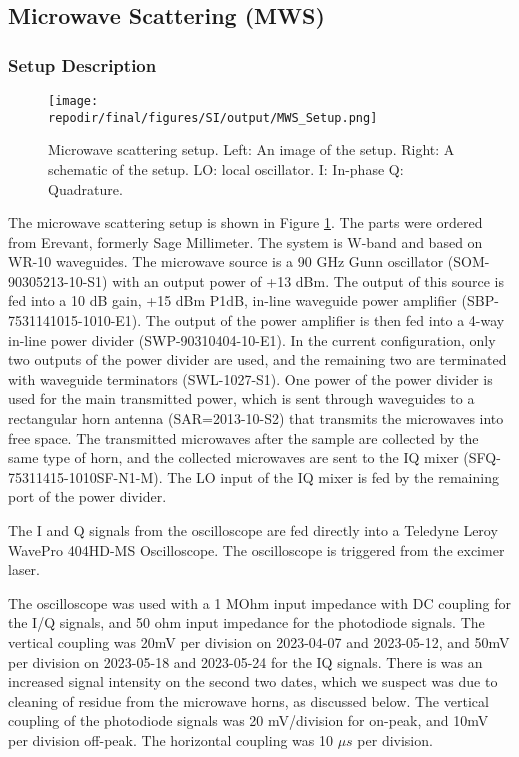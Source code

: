 \clearpage
\subsection{Microwave Scattering (MWS) }


\subsubsection{Setup Description}
\begin{figure}[]
\centering
\texttt{[image: \\repodir/final/figures/SI/output/MWS\_Setup.png]}
\caption{Microwave scattering setup. Left: An image of the setup. Right: A schematic of the setup. LO: local oscillator. I: In-phase Q: Quadrature.  }
\label{fig:SI_MWS_Setup}
\end{figure}

The microwave scattering setup is shown in Figure \ref{fig:SI_MWS_Setup}. The parts were ordered from Erevant, formerly Sage Millimeter. The system is W-band and based on WR-10 waveguides. The microwave source is a 90 GHz Gunn oscillator (SOM-90305213-10-S1) with an output power of +13 dBm. The output of this source is fed into a 10 dB gain, +15 dBm P1dB, in-line waveguide power amplifier (SBP-7531141015-1010-E1). The output of the power amplifier is then fed into a 4-way in-line power divider (SWP-90310404-10-E1). In the current configuration, only two outputs of the power divider are used, and the remaining two are terminated with waveguide terminators (SWL-1027-S1). One power of the power divider is used for the main transmitted power, which is sent through waveguides to a rectangular horn antenna (SAR=2013-10-S2) that transmits the microwaves into free space. The transmitted microwaves after the sample are collected by the same type of horn, and the collected microwaves are sent to the IQ mixer (SFQ-75311415-1010SF-N1-M). The LO input of the IQ mixer is fed by the remaining port of the power divider. 


The I and Q signals from the oscilloscope are fed directly into a Teledyne Leroy WavePro 404HD-MS Oscilloscope.  The oscilloscope is triggered from the excimer laser. 

The oscilloscope was used with a 1 MOhm input impedance with DC coupling for the I/Q signals, and 50 ohm input impedance for the photodiode signals. The vertical coupling was 20mV per division on 2023-04-07 and 2023-05-12, and 50mV per division on 2023-05-18 and 2023-05-24 for the IQ signals. There is was an increased signal intensity on the second two dates, which we suspect was due to cleaning of residue from the microwave horns, as discussed below. The vertical coupling of the photodiode signals was 20 mV/division for on-peak, and 10mV per division off-peak. The horizontal coupling was 10 $\mu s$ per division. 

